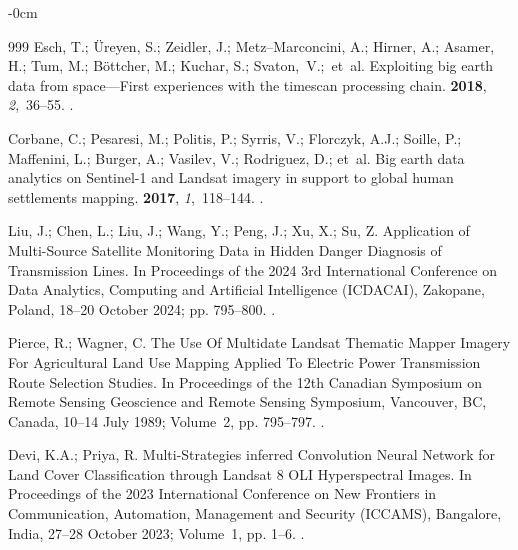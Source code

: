 \documentclass[jimaging,article,accept,pdftex,oneauthor]{Definitions/mdpi}
\begin{document}
\begin{adjustwidth}{-\extralength}{0cm}
\begin{thebibliography}{999}
Esch, T.; Üreyen, S.; Zeidler, J.; Metz–Marconcini, A.; Hirner, A.; Asamer,
  H.; Tum, M.; Böttcher, M.; Kuchar, S.; \mbox{Svaton, V.;  et~al.}
\newblock Exploiting big earth data from space---First experiences with the
  timescan processing chain.
 {\bf 2018}, {\em 2},~36--55.
.

Corbane, C.; Pesaresi, M.; Politis, P.; Syrris, V.; Florczyk, A.J.; Soille, P.;
  Maffenini, L.; Burger, A.; Vasilev, V.; Rodriguez, D.;  et~al.
\newblock Big earth data analytics on Sentinel-1 and Landsat imagery in support
  to global human settlements mapping.
 {\bf 2017}, {\em 1},~118--144.
.

Liu, J.; Chen, L.; Liu, J.; Wang, Y.; Peng, J.; Xu, X.; Su, Z.
\newblock Application of Multi-Source Satellite Monitoring Data in Hidden
  Danger Diagnosis of Transmission Lines.
\newblock In Proceedings of the 2024 3rd International Conference on Data
  Analytics, Computing and Artificial Intelligence (ICDACAI), {Zakopane, Poland, 18--20 October} 2024; pp.
  795--800.
.

Pierce, R.; Wagner, C.
\newblock The Use Of Multidate Landsat Thematic Mapper Imagery For Agricultural
  Land Use Mapping Applied To Electric Power Transmission Route Selection
  Studies.
\newblock In Proceedings of the 12th Canadian Symposium on Remote Sensing
  Geoscience and Remote Sensing Symposium, {Vancouver, BC, Canada, 10--14 July} 1989; Volume~2, pp. 795--797.
.

Devi, K.A.; Priya, R.
\newblock Multi-Strategies inferred Convolution Neural Network for Land Cover
  Classification through Landsat 8 OLI Hyperspectral Images.
\newblock In Proceedings of the 2023 International Conference on New Frontiers
  in Communication, Automation, Management and Security (ICCAMS), {Bangalore, India, 27--28 October} 2023;
  Volume~1, pp. 1--6.
.


\end{thebibliography}
\end{adjustwidth}
\end{document}
